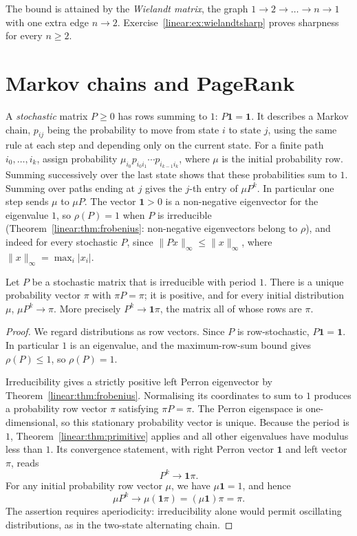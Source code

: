 The bound is attained by the \emph{Wielandt matrix}, the graph
$1\to2\to\dots\to n\to1$ with one extra edge $n\to2$.
Exercise~\ref{linear:ex:wielandtsharp} proves sharpness for every $n\ge2$.

\section{Markov chains and PageRank}

A \emph{stochastic} matrix $P\ge0$ has rows summing to $1$: $P\mathbf 1=\mathbf 1$. It describes a Markov chain, $p_{ij}$ being the
probability to move from state $i$ to state $j$, using the same rule at each
step and depending only on the current state. For a finite path
$i_0,\ldots,i_k$, assign probability
$\mu_{i_0}p_{i_0i_1}\cdots p_{i_{k-1}i_k}$, where $\mu$ is the initial
probability row. Summing successively over the last state shows that these
probabilities sum to $1$. Summing over paths ending at $j$ gives the $j$-th
entry of $\mu P^k$. In particular one step sends $\mu$ to $\mu P$. The vector $\mathbf 1>0$ is a non-negative eigenvector for the eigenvalue $1$, so $\rho(P)=1$ when $P$ is irreducible
(Theorem~\ref{linear:thm:frobenius}: non-negative eigenvectors belong to $\rho$), and indeed for every stochastic $P$, since $\|Px\|_\infty
\le\|x\|_\infty$, where $\|x\|_\infty=\max_i|x_i|$.

\begin{corollary}\label{linear:cor:markov}
Let $P$ be a stochastic matrix that is irreducible with period $1$. There is a unique probability vector $\pi$ with $\pi P=\pi$;
it is positive, and for every initial distribution $\mu$, $\mu P^k\to\pi$. More precisely $P^k\to\mathbf 1\pi$, the matrix all of
whose rows are $\pi$.
\end{corollary}
\begin{proof}
We regard distributions as row vectors.
Since $P$ is row-stochastic,
$P\mathbf 1=\mathbf 1$. In particular $1$
is an eigenvalue, and the maximum-row-sum
bound gives $\rho(P)\le1$, so $\rho(P)=1$.

Irreducibility gives a strictly positive left
Perron eigenvector by
Theorem~\ref{linear:thm:frobenius}. Normalising
its coordinates to sum to $1$ produces a
probability row vector $\pi$ satisfying
$\pi P=\pi$. The Perron eigenspace is
one-dimensional, so this stationary probability
vector is unique. Because the period is $1$,
Theorem~\ref{linear:thm:primitive} applies and
all other eigenvalues have modulus less than
$1$. Its convergence statement, with right
Perron vector $\mathbf 1$ and left vector
$\pi$, reads
\[
P^k\longrightarrow\mathbf1\pi.
\]
For any initial probability row vector $\mu$,
we have $\mu\mathbf1=1$, and hence
\[
\mu P^k\longrightarrow
\mu(\mathbf1\pi)=(\mu\mathbf1)\pi=\pi.
\]
The assertion requires aperiodicity:
irreducibility alone would permit oscillating
distributions, as in the two-state alternating
chain.
\end{proof}

